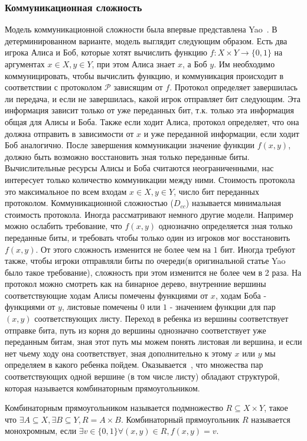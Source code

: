 \documentclass{article}
\begin{document}
\subsubsection{Коммуникационная сложность}
Модель коммуникационной сложности была впервые представлена Yao~\cite{yao}. В детерминированном варианте, модель выглядит следующим образом. Есть два игрока Алиса и Боб, которые хотят вычислить функцию $f: X \times Y \to \{0, 1\}$ на аргументах $x \in X, y \in Y$, при этом Алиса знает $x$, а Боб $y$. Им необходимо коммуницировать, чтобы вычислить функцию, и коммуникация происходит в соответствии с протоколом $\mathcal{P}$ зависящим от $f$. Протокол определяет завершилась ли передача, и если не завершилась, какой игрок отправляет бит следующим. Эта информация зависит только от уже переданных бит, т.к. только эта информация общая для Алисы и Боба. Также если ходит Алиса, протокол определяет, что она должна отправить в зависимости от $x$ и уже переданной информации, если ходит Боб аналогично. После завершения коммуникации значение функции $f(x, y)$, должно быть возможно восстановить зная только переданные биты. Вычислительные ресурсы Алисы и Боба  считаются неограниченными, нас интересует только количество коммуникации между ними. Стоимость протокола это максимальное по всем входам $x \in X, y \in Y$, число бит переданных протоколом. Коммуникационной сложностью ($D_{cc}$) называется минимальная стоимость протокола. Иногда рассматривают немного другие модели. Например можно ослабить требование, что $f(x, y)$ однозначно определяется зная только переданные биты, и требовать чтобы только один из игроков мог восстановить $f(x, y)$. От этого сложность изменится не более чем на $1$ бит. Иногда требуют также, чтобы игроки отправляли биты по очереди(в оригинальной статье Yao было такое требование), сложность при этом изменится не более чем в 2 раза.
На протокол можно смотреть как на бинарное дерево, внутренние вершины соответствующие ходам Алисы помечены функциями от $x$, ходам Боба - функциями от $y$, листовые помечены $0$ или $1$ - значением функции для пар $(x, y)$ соответствующих листу. Переход в ребенка из вершины соответствует отправке бита, путь из корня до вершины однозначно соответствует уже переданным битам, зная этот путь мы можем понять листовая ли вершина, и если нет чьему ходу она соответствует, зная дополнительно к этому $x$ или $y$ мы определяем в какого ребенка пойдем. Оказывается~\cite{nisan}, что множества пар соответствующих одной вершине (в том числе листу) обладают структурой, которая называется комбинаторным прямоугольником.
\begin{definition}
    Комбинаторным прямоугольником называется подмножество $R \subseteq X \times Y$, такое что $\exists A \subseteq X, \exists B \subseteq Y, R = A \times B$. Комбинаторный прямоугольник $R$ называется монохромным, если $\exists v \in \{0, 1\} \forall (x, y) \in R, f(x, y) = v$.
\end{definition}
\end{document}
